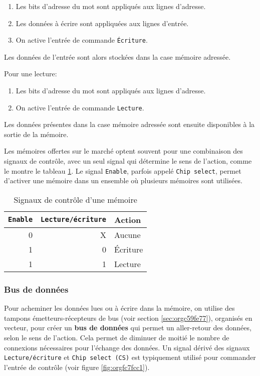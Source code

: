 \documentclass[11pt]{article}
\begin{document}
\begin{enumerate}
\item Les bits d'adresse du mot sont appliqués aux lignes d'adresse.
\item Les données à écrire sont appliquées aux lignes d'entrée.
\item On active l'entrée de commande \texttt{Écriture}.
\end{enumerate}

Les données de l'entrée sont alors stockées dans la case mémoire adressée.

Pour une lecture:

\begin{enumerate}
\item Les bits d'adresse du mot sont appliqués aux lignes d'adresse.
\item On active l'entrée de commande \texttt{Lecture}.
\end{enumerate}

Les données présentes dans la case mémoire adressée sont ensuite
disponibles à la sortie de la mémoire.

Les mémoires offertes sur le marché optent souvent pour une
combinaison des signaux de contrôle, avec un seul signal qui détermine
le sens de l'action, comme le montre le tableau
\ref{tab:org4a460da}. Le signal \texttt{Enable}, parfois appelé \texttt{Chip
select}, permet d'activer une mémoire dans un ensemble où plusieurs
mémoires sont utilisées.

\begin{table}[htbp]
\caption{\label{tab:org4a460da}Signaux de contrôle d'une mémoire}
\centering
\begin{tabular}{rrl}
\texttt{Enable} & \texttt{Lecture/écriture} & Action\\[0pt]
\hline
0 & X & Aucune\\[0pt]
1 & 0 & Écriture\\[0pt]
1 & 1 & Lecture\\[0pt]
\end{tabular}
\end{table}

\subsubsection{Bus de données}
\label{sec:orgb984e79}

Pour acheminer les données lues ou à écrire dans la mémoire, on
utilise des tampons émetteurs-récepteurs de bus (voir section \ref{sec:orgc59fe77}), organisés en vecteur, pour créer un
\textbf{bus de données} qui permet un aller-retour des données, selon le sens
de l'action. Cela permet de diminuer de moitié le nombre de connexions
nécessaires pour l'échange des données.  Un signal dérivé des signaux
\texttt{Lecture/écriture} et \texttt{Chip select (CS)} est typiquement utilisé pour
commander l'entrée de contrôle (voir figure \ref{fig:orgfc7fcc1}).
\end{document}
